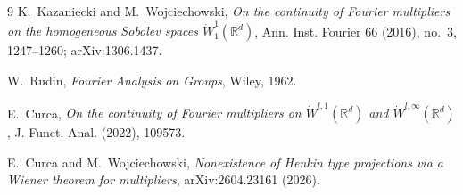 \documentclass[11pt]{article}
\newcommand{\R}{\mathbb R}
\begin{document}
\small
\begin{thebibliography}{9}
K.~Kazaniecki and M.~Wojciechowski,
\emph{On the continuity of Fourier multipliers on the homogeneous Sobolev
spaces $\dot W^1_1(\R^d)$}, Ann. Inst. Fourier 66 (2016), no.~3,
1247--1260; arXiv:1306.1437.

W.~Rudin, \emph{Fourier Analysis on Groups}, Wiley, 1962.

E.~Curca, \emph{On the continuity of Fourier multipliers on
$\dot W^{l,1}(\R^d)$ and $\dot W^{l,\infty}(\R^d)$}, J. Funct. Anal.
(2022), 109573.

E.~Curca and M.~Wojciechowski,
\emph{Nonexistence of Henkin type projections via a Wiener theorem for
multipliers}, arXiv:2604.23161 (2026).
\end{thebibliography}
\end{document}
